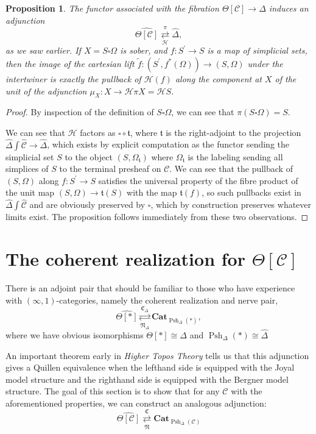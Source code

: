 \documentclass{amsart}
\numberwithin{equation}{section}
\theoremstyle{plain}   %
\newtheorem{prop}[subsection]{Proposition}
\theoremstyle{remark}
\theoremstyle{plain}
\DeclareMathOperator{\Psh}{Psh}
\newcommand{\Cat}{\ensuremath{\mathbf{Cat}}}
\newcommand{\psh}[1]{\ensuremath{\widehat{#1}}}
\newcommand{\C}{\ensuremath{\mathcal{C}}}
\newcommand{\cellset}{\ensuremath{\widehat{\Theta[\mathcal{C}]}}}
\begin{document}
\begin{prop}
	The functor associated with the fibration \(\Theta[\C]\to \Delta\) induces an adjunction 
	\[\cellset \underset{\mathscr{H}}{\overset{\pi}{\rightleftarrows}} \psh{\Delta},\]
	as we saw earlier. If \(X=S\square\Omega\) is sober, and \(f:S^\prime\to S\) is a map of simplicial sets, then the image of the cartesian lift \(\tilde{f}:(S^\prime, f^\ast(\Omega))\to (S,\Omega)\) under the intertwiner is exactly the pullback of \(\mathscr{H}(f)\) along the component at \(X\) of the unit of the adjunction \(\mu_X:X\to \mathscr{H}\pi X= \mathscr{H} S\).
\end{prop}
\begin{proof} By inspection of the definition of \(S\square\Omega\), we can see that \(\pi(S\square\Omega)=S\).

	We can see that \(\mathscr{H}\) factors as \(\square\circ \mathfrak{t}\), where \(\mathfrak{t}\) is the right-adjoint to the projection \(\psh{\Delta}\int \psh{\C}\to \psh{\Delta}\), which exists by explicit computation as the functor sending the simplicial set \(S\) to the object \((S,\Omega_{\mathfrak{t}})\) where \(\Omega_{\mathfrak{t}}\) is the labeling sending all simplices of \(S\) to the terminal presheaf on \(\C\).   We can see that the pullback of \((S,\Omega)\) along \(f:S^\prime\to S\) satisfies the universal property of the fibre product of the unit map \((S,\Omega)\to \mathfrak{t}(S)\) with the map \(\mathfrak{t}(f)\), so such pullbacks exist in \(\psh{\Delta}\int \psh{\C}\) and are obviously preserved by \(\square\), which by construction preserves whatever limits exist. The proposition follows immediately from these two observations.
\end{proof}
\section{The coherent realization for \(\Theta[\C]\)}
There is an adjoint pair that should be familiar to those who have experience with \((\infty,1)\)-categories, namely the coherent realization and nerve pair, \[\psh{\Theta[\ast]}  \underset{\mathfrak{N}_\Delta}{\overset{\mathfrak{C}_\Delta}{\rightleftarrows}} \Cat_{\Psh_\Delta(\ast)},\] where we have obvious isomorphisms \(\Theta[\ast]\cong \Delta\) and \(\Psh_\Delta(\ast)\cong \psh{\Delta}\)

An important theorem early in \emph{Higher Topos Theory} tells us that this adjunction gives a Quillen equivalence when the lefthand side is equipped with the Joyal model structure and the righthand side is equipped with the Bergner model structure.  The goal of this section is to show that for any \(\C\) with the aforementioned properties, we can construct an analogous adjunction:
\[\cellset \underset{\mathfrak{N}}{\overset{\mathfrak{C}}{\rightleftarrows}} \Cat_{\Psh_\Delta(\C)}\]
\end{document}
